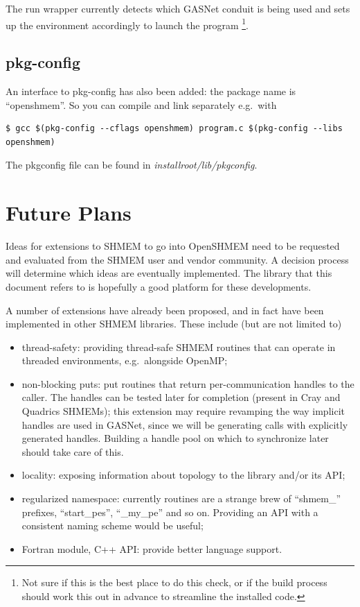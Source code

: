 \documentclass[english]{article}
\begin{document}
The run wrapper currently detects which GASNet conduit is being used
and sets up the environment accordingly to launch the program
\footnote{Not sure if this is the best place to do this check, or if
  the build process should work this out in advance to streamline the
  installed code.}.

\subsection{pkg-config}

An interface to pkg-config has also been added: the package name is
``openshmem''.  So you can compile and link separately e.g.\ with

\begin{lstlisting}
$ gcc $(pkg-config --cflags openshmem) program.c $(pkg-config --libs openshmem)
\end{lstlisting}

The pkgconfig file can be found in \emph{installroot/lib/pkgconfig}.

\section{Future Plans}

Ideas for extensions to SHMEM to go into OpenSHMEM need to be
requested and evaluated from the SHMEM user and vendor community. A
decision process will determine which ideas are eventually
implemented. The library that this document refers to is hopefully a
good platform for these developments.

A number of extensions have already been proposed, and in fact have
been implemented in other SHMEM libraries. These include (but are not
limited to)

\begin{itemize}
\item thread-safety: providing thread-safe SHMEM routines that can
operate in threaded environments, e.g.\ alongside OpenMP;
\item non-blocking puts: put routines that return per-communication
handles to the caller. The handles can be tested later for completion
(present in Cray and Quadrics SHMEMs); this extension may require
revamping the way implicit handles are used in GASNet, since we will
be generating calls with explicitly generated handles. Building a
handle pool on which to synchronize later should take care of this.
\item locality: exposing information about topology to the library
and/or its API;
\item regularized namespace: currently routines are a strange brew of
``shmem\_'' prefixes, ``start\_pes'', ``\_my\_pe'' and so
on. Providing an API with a consistent naming scheme would be useful;
\item Fortran module, C++ API: provide better language support.
\end{itemize}
\end{document}

